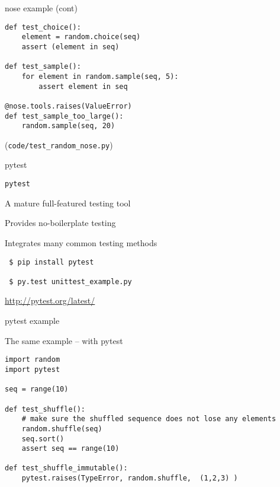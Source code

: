 \documentclass{beamer}
\begin{document}
\begin{frame}[fragile]{nose example (cont) }

{\small
\begin{verbatim}
def test_choice():
    element = random.choice(seq)
    assert (element in seq)

def test_sample():
    for element in random.sample(seq, 5):
        assert element in seq

@nose.tools.raises(ValueError)
def test_sample_too_large():
    random.sample(seq, 20)
\end{verbatim}
}

\vfill
(\verb|code/test_random_nose.py|)

\end{frame} 


\begin{frame}[fragile]{pytest}

{\LARGE \verb|pytest|}

\vfill
{\Large \hspace{0.2in} A mature full-featured testing tool}

\vfill
{\Large \hspace{0.2in} Provides no-boilerplate testing}

\vfill
{\Large \hspace{0.2in} Integrates many common testing methods}

\vfill
\begin{verbatim}
 $ pip install pytest

 $ py.test unittest_example.py 
\end{verbatim}

\vfill
\url{http://pytest.org/latest/}
\end{frame} 

\begin{frame}[fragile]{pytest example}

{\Large The same example -- with pytest}

{\small
\begin{verbatim}
import random
import pytest

seq = range(10)

def test_shuffle():
    # make sure the shuffled sequence does not lose any elements
    random.shuffle(seq)
    seq.sort()
    assert seq == range(10)

def test_shuffle_immutable():
    pytest.raises(TypeError, random.shuffle,  (1,2,3) )
\end{verbatim}
}

\end{frame} 
\end{document}
